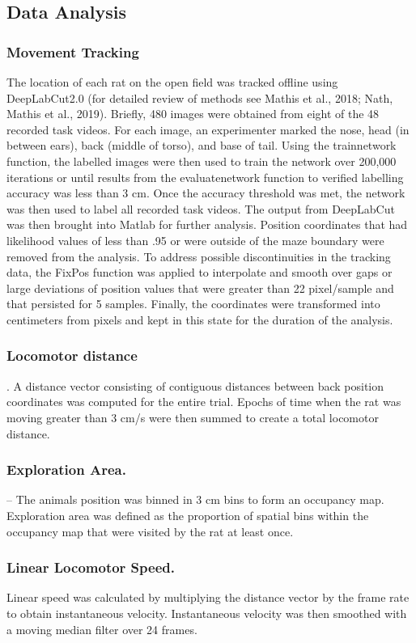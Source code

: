 \documentclass[fleqn,10pt]{wlscirep}
\begin{document}
\subsection*{Data Analysis}
\subsubsection*{Movement Tracking}The location of each rat on the open field was tracked offline using DeepLabCut2.0 (for detailed review of methods see Mathis et al., 2018; Nath, Mathis et al., 2019). Briefly, 480 images were obtained from eight of the 48 recorded task videos. For each image, an experimenter marked the nose, head (in between ears), back (middle of torso), and base of tail. Using the trainnetwork function, the labelled images were then used to train the network over 200,000 iterations or until results from the evaluatenetwork function to verified labelling accuracy was less than 3 cm. Once the accuracy threshold was met, the network was then used to label all recorded task videos. The output from DeepLabCut was then brought into Matlab for further analysis. Position coordinates that had likelihood values of less than .95 or were outside of the maze boundary were removed from the analysis. To address possible discontinuities in the tracking data, the FixPos function was applied to interpolate and smooth over gaps or large deviations of position values that were greater than 22 pixel/sample and that persisted for 5 samples. Finally, the coordinates were transformed into centimeters from pixels and kept in this state for the duration of the analysis. 
\subsubsection*{Locomotor distance}. A distance vector consisting of contiguous distances between back position coordinates was computed for the entire trial. Epochs of time when the rat was moving greater than 3 cm/s were then summed to create a total locomotor distance.  
\subsubsection*{Exploration Area.} – The animals position was binned in 3 cm bins to form an occupancy map. Exploration area was defined as the proportion of spatial bins within the occupancy map that were visited by the rat at least once. 
\subsubsection*{Linear Locomotor Speed.} Linear speed was calculated by multiplying the distance vector by the frame rate to obtain instantaneous velocity. Instantaneous velocity was then smoothed with a moving median filter over 24 frames. 
\end{document}
